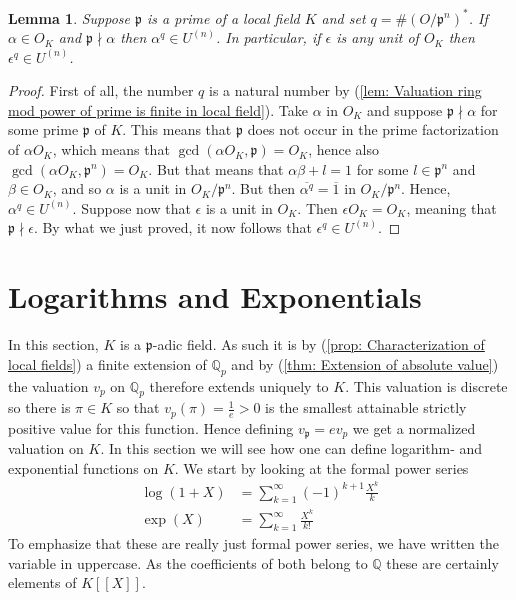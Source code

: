 \documentclass{article}
\newtheorem{lemma}{Lemma}[section]
\newcommand{\mfrak}[1]{\mathfrak{#1}}
\newcommand{\mbb}[1]{\mathbb{#1}}
\newcommand{\vp}{{v_{\mfrak p}}}
\begin{document}
\begin{lemma}
    Suppose $\mfrak p$ is a prime of a local field $K$ and set $q = \# (O / \mfrak p^n)^*$. If $\alpha \in O_K$ and $\mfrak p \nmid \alpha$ then $\alpha^q \in U^{(n)}$. In particular, if $\epsilon$ is any unit of $O_K$ then $\epsilon^q \in U^{(n)}$.
\end{lemma}
\begin{proof}
    First of all, the number $q$ is a natural number by (\ref{lem: Valuation ring mod power of prime is finite in local field}). Take $\alpha$ in $O_K$ and suppose $\mfrak p \nmid \alpha$ for some prime $\mfrak p$ of $K$. This means that $\mfrak p$ does not occur in the prime factorization of $\alpha O_K$, which means that $\gcd(\alpha O_K, \mfrak p) = O_K$, hence also $\gcd(\alpha O_K, \mfrak p^n) = O_K$. But that means that $\alpha \beta + l = 1$ for some $l \in \mfrak p^n$ and $\beta \in O_K$, and so $\alpha$ is a unit in $O_K / \mfrak p^n$. But then $\overline{\alpha^q} = \overline 1$ in $O_K / \mfrak p^n$. Hence, $\alpha^q \in U^{(n)}$. Suppose now that $\epsilon$ is a unit in $O_K$. Then $\epsilon O_K = O_K$, meaning that $\mfrak p \nmid \epsilon$. By what we just proved, it now follows that $\epsilon^q \in U^{(n)}$. 
\end{proof}



\section{Logarithms and Exponentials}
In this section, $K$ is a $\mfrak p$-adic field. As such it is by (\ref{prop: Characterization of local fields}) a finite extension of $\mbb Q_p$ and by (\ref{thm: Extension of absolute value}) the valuation $v_p$ on $\mbb Q_p$ therefore extends uniquely to $K$. This valuation is discrete so there is $\pi \in K$ so that $v_p(\pi) = \frac{1}{e} > 0$ is the smallest attainable strictly positive value for this function. Hence defining $\vp = e v_p$ we get a normalized valuation on $K$. In this section we will see how one can define logarithm- and exponential functions on $K$. We start by looking at the formal power series 
\begin{align*}
    \log(1+X) &= \sum_{k = 1}^\infty (-1)^{k+1}\frac{X^k}{k} \\
    \exp(X) &= \sum_{k = 1}^\infty \frac{X^k}{k!} 
\end{align*}
To emphasize that these are really just formal power series, we have written the variable in uppercase. As the coefficients of both belong to $\mbb Q$ these are certainly elements of $K[[X]]$.
\end{document}
